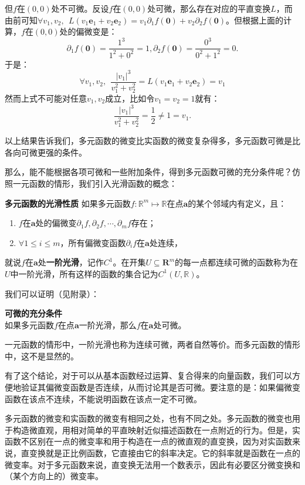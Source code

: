 \documentclass[12pt,UTF8]{ctexbook}
\begin{document}
但$f$在$(0,0)$处不可微。反设$f$在$(0,0)$处可微，那么存在对应的平直变换$L$，而由前可知$\forall v_1, v_2,\;\,L(v_1 \mathbf{e}_1 + v_2 \mathbf{e}_2) = v_1 \partial_{1} f(\mathbf{0}) + v_2 \partial_{2} f(\mathbf{0}) $。但根据上面的计算，$f$在$(0,0)$处的偏微变是：
$$ \partial_{1} f(\mathbf{0}) = \frac{1^3}{1^2 + 0^2} = 1, \partial_{2} f(\mathbf{0}) = \frac{0^3}{0^2 + 1^2} = 0. $$
于是：
$$\forall v_1, v_2,\;\, \frac{|v_1|^3}{v_1^2 + v_2^2} = L(v_1 \mathbf{e}_1 + v_2 \mathbf{e}_2) = v_1 $$
然而上式不可能对任意$v_1, v_2$成立，比如令$v_1=v_2 = 1$就有：
$$ \frac{|v_1|^3}{v_1^2 + v_2^2} = \frac{1}{2} \neq 1 = v_1. $$

以上结果告诉我们，多元函数的微变比实函数的微变复杂得多，多元函数可微是比各向可微更强的条件。

那么，能不能根据各项可微和一些附加条件，得到多元函数可微的充分条件呢？仿照一元函数的情形，我们引入光滑函数的概念：
\begin{df}{\textbf{多元函数的光滑性质}}
    如果多元函数$f: \mathbb{R}^m \mapsto \mathbb{R}$在点$\mathbf{a}$的某个邻域内有定义，且：
    \begin{enumerate}
    \item $f$在$\mathbf{a}$处的偏微变$\partial_1 f, \partial_2 f, \cdots, \partial_m f$存在；
    \item $\forall 1\leqslant i \leqslant m$，所有偏微变函数$\partial_i f$在$\mathbf{a}$处连续，
    \end{enumerate}
    就说$f$在$\mathbf{a}$处\textbf{一阶光滑}，记作$C^1$。在开集$U\subseteq\mathbf{R}^m$的每一点都连续可微的函数称为在$U$中一阶光滑，所有这样的函数的集合记为$C^1(U, \mathbb{R})$。
\end{df}
我们可以证明（见附录）：
\begin{tm}{\textbf{可微的充分条件}}\\
如果多元函数$f$在点$\mathbf{a}$一阶光滑，那么$f$在$\mathbf{a}$处可微。
\end{tm}
一元函数的情形中，一阶光滑也称为连续可微，两者自然等价。而多元函数的情形中，这不是显然的。

有了这个结论，对于可以从基本函数经过运算、复合得来的向量函数，我们可以方便地验证其偏微变函数是否连续，从而讨论其是否可微。要注意的是：如果偏微变函数在该点不连续，不能说明函数在该点一定不可微。

多元函数的微变和实函数的微变有相同之处，也有不同之处。多元函数的微变也用于构造微直观，用相对简单的平直映射近似描述函数在一点附近的行为。但是，实函数不区别在一点的微变率和用于构造在一点的微直观的直变换，因为对实函数来说，直变换就是正比例函数，它直接由它的斜率决定。它的斜率就是函数在一点的微变率。对于多元函数来说，直变换无法用一个数表示，因此有必要区分微变换和（某个方向上的）微变率。
\end{document}
